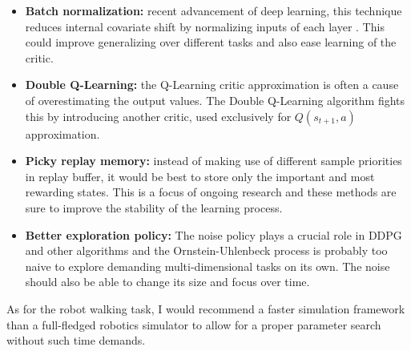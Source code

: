\begin{itemize}
\item \textbf{Batch normalization:} recent advancement of deep learning, this technique reduces internal covariate shift by normalizing inputs of each layer \cite{cite:batchnorm}. This could improve generalizing over different tasks and also ease learning of the critic.

\item \textbf{Double Q-Learning:} the Q-Learning critic approximation is often a cause of overestimating the output values. The Double Q-Learning algorithm \cite{cite:doubledqn} fights this by introducing another critic, used exclusively for $Q(s_{t+1},a)$ approximation.

\item \textbf{Picky replay memory:} instead of making use of different sample priorities in replay buffer, it would be best to store only the important and most rewarding states. This is a focus of ongoing research and these methods are sure to improve the stability of the learning process.

\item \textbf{Better exploration policy:} The noise policy plays a crucial role in DDPG and other algorithms and the Ornstein-Uhlenbeck process is probably too naive to explore demanding multi-dimensional tasks on its own. The noise should also be able to change its size and focus over time. 

\end{itemize}

\medskip

As for the robot walking task, I would recommend a faster simulation framework than a full-fledged robotics simulator to allow for a proper parameter search without such time demands.